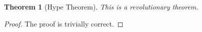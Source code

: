 \documentclass{article}
\newtheorem{theorem}{Theorem}
\begin{document}
\begin{theorem}[Hype Theorem]
This is a revolutionary theorem.
\end{theorem}
\begin{proof}
The proof is trivially correct.
\end{proof}
\end{document}
